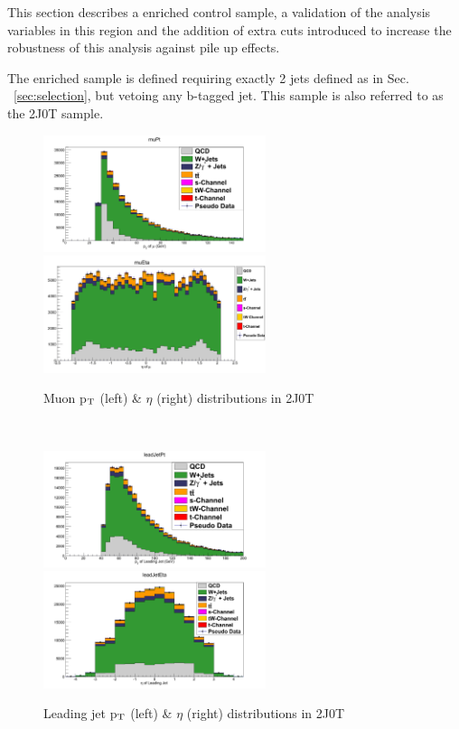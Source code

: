 This section describes a \wjets enriched control sample, a validation of the
analysis variables in this region and the addition of extra cuts introduced
to increase the robustness of this analysis against pile up effects.

The \wjets enriched sample is defined requiring exactly 2 jets defined as in Sec. ~\ref{sec:selection},
but vetoing any b-tagged jet. This sample is also referred to as the 2J0T sample.

\begin{figure}[hbpt]
\begin{center}
\caption{Muon p$_{\rm{T}}$ (left) \& $\eta$ (right) distributions in 2J0T}
\includegraphics[width=6.5cm]{figures/2J0T/muPt.png}
\includegraphics[width=6.5cm]{figures/2J0T/muEta.png}\hfill
\end{center}
\end{figure}
\\
\begin{figure}[hbpt]
\begin{center}
\caption{Leading jet p$_{\rm{T}}$ (left) \& $\eta$ (right) distributions in 2J0T}
\includegraphics[width=6.5cm]{figures/2J0T/leadJetPt.png}
\includegraphics[width=6.5cm]{figures/2J0T/leadJetEta.png}\hfill
\end{center}
\end{figure}
